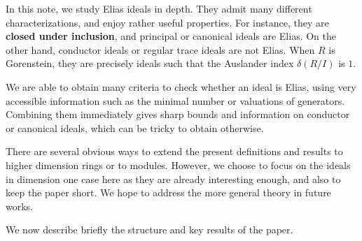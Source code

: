 \documentclass[a4paper,12pt]{amsart}
\theoremstyle{definition}
\theoremstyle{remark}
\numberwithin{equation}{section}
\begin{document}
In this note, we study Elias ideals in depth. They admit many different characterizations, and enjoy rather useful properties. For instance, they are {\bf closed under inclusion}, and principal or canonical ideals are Elias. On the other hand, conductor ideals or regular trace ideals are not Elias. When $R$ is Gorenstein, they are precisely ideals such that the Auslander index $\delta(R/I)$ is $1$. 

We are able to obtain many criteria to check whether an ideal is Elias, using very accessible information such as the minimal number or valuations of generators. Combining them immediately gives sharp bounds and  information on  conductor or canonical ideals, which can be tricky to obtain otherwise.  

There are several obvious ways to extend the present definitions and results to higher dimension rings or to modules. However, we choose to focus on the ideals in dimension one case here as they are already interesting enough, and also to keep the paper short.  We hope to address the more general theory in future works. 

We now describe briefly the structure and key results of the paper.
\end{document}
